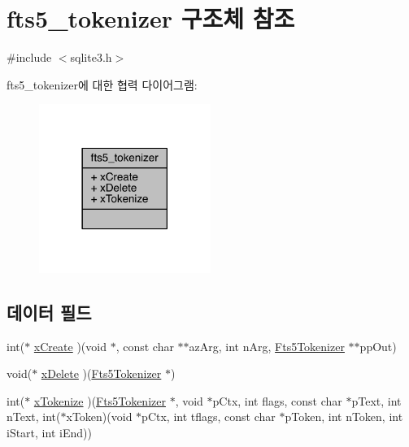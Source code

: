 \hypertarget{structfts5__tokenizer}{}\section{fts5\+\_\+tokenizer 구조체 참조}
\label{structfts5__tokenizer}


{\ttfamily \#include $<$sqlite3.\+h$>$}



fts5\+\_\+tokenizer에 대한 협력 다이어그램\+:
\nopagebreak
\begin{figure}[H]
\begin{center}
\leavevmode
\includegraphics[width=158pt]{d3/d44/structfts5__tokenizer__coll__graph}
\end{center}
\end{figure}
\subsection*{데이터 필드}
\begin{DoxyCompactItemize}
\item 
int($\ast$ \hyperlink{structfts5__tokenizer_a61846ad000b2d38a1264c342c8201d5c}{x\+Create} )(void $\ast$, const char $\ast$$\ast$az\+Arg, int n\+Arg, \hyperlink{sqlite3_8h_ac015f88c5332d612a3125fc0014e468c}{Fts5\+Tokenizer} $\ast$$\ast$pp\+Out)
\item 
void($\ast$ \hyperlink{structfts5__tokenizer_aaaa88b9f3e50f0b1120a05fb1bbb251f}{x\+Delete} )(\hyperlink{sqlite3_8h_ac015f88c5332d612a3125fc0014e468c}{Fts5\+Tokenizer} $\ast$)
\item 
int($\ast$ \hyperlink{structfts5__tokenizer_ae65ca5a9b1e6d5c1ef09731fccefa577}{x\+Tokenize} )(\hyperlink{sqlite3_8h_ac015f88c5332d612a3125fc0014e468c}{Fts5\+Tokenizer} $\ast$, void $\ast$p\+Ctx, int flags, const char $\ast$p\+Text, int n\+Text, int($\ast$x\+Token)(void $\ast$p\+Ctx, int tflags, const char $\ast$p\+Token, int n\+Token, int i\+Start, int i\+End))
\end{DoxyCompactItemize}


